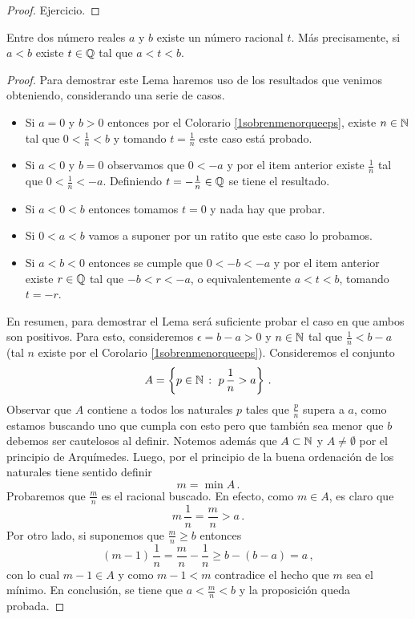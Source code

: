 \begin{proof}
    Ejercicio.
\end{proof}

\begin{lemma}\label{P:densidad de Q en R}
    Entre dos número reales $a$ y $b$ 
    existe un número racional $t$. 
    Más precisamente, si $a < b$ existe 
    $t \in \mathbb{Q}$ tal que $a < t < b$.
\end{lemma}

\begin{proof}
    Para demostrar este Lema haremos uso 
    de los resultados que venimos obteniendo, considerando una serie de 
    casos.
    \begin{itemize}
        \item Si $a = 0$ y $b > 0$ entonces por el Colorario 
        \ref{1sobrenmenorqueeps}, existe ${n\in\mathbb{N}}$ tal que $0<\frac1n < b$ y tomando $t=\frac1n$ este caso está probado.
        \item Si $a < 0$ y $b =0$ observamos que $0 < -a$ y por el 
        item anterior existe $\frac1n$ tal que $0 < \frac1n < -a$. Definiendo $t=-\frac1n \in \mathbb{Q}$ se tiene el resultado.
        \item Si $a < 0 < b$ entonces tomamos $t=0$ y nada hay que probar.
        \item Si $0 < a < b$ vamos a suponer por un ratito que este caso lo probamos.
        \item Si $a < b < 0$ entonces se 
        cumple que $0 < -b < -a$ y por el item anterior existe $r\in \mathbb{Q}$ tal que $-b < r < -a$, o equivalentemente $a < t < b$, tomando $t=-r$.
    \end{itemize}
    En resumen, para demostrar el Lema será suficiente probar el caso en que ambos son positivos. Para esto, consideremos $\epsilon=b-a > 0$ y 
    ${n\in\mathbb{N}}$ tal que $\frac1n < b-a$ (tal $n$ existe por el Corolario \ref{1sobrenmenorqueeps}). 
    Consideremos el conjunto
    \[ A=\left\{p \in \mathbb{N}\,: ~ p\,\frac1n > a\right\}\,. \]
    Observar que $A$ contiene a todos los 
    naturales $p$ tales que $\frac{p}{n}$ supera a $a$, como estamos buscando uno que cumpla con esto pero que también sea menor que $b$ debemos ser cautelosos al definir. 
    Notemos además que $A \subset \mathbb{N}$ y $A \neq \emptyset$ por el principio de Arquímedes. Luego, por el principio de la buena ordenación de los naturales tiene sentido definir 
    \[  m = \min A \,.\]
    Probaremos que $\frac{m}{n}$ es el 
    racional buscado. En efecto, como $m \in A$, es claro que 
    \[ m \, \frac1n = \frac{m}{n} > a\,.\]
%
    Por otro lado, si suponemos que 
    $\frac{m}{n} \geq b$ entonces 
    \[  (m-1)\,\frac1n = \frac{m}{n} - \frac1n \geq b - (b - a) = a\,,\]
    con lo cual $m-1 \in A$ y como $m-1 < m$ contradice el hecho que $m$ sea el mínimo. En conclusión, se tiene que $a < \frac{m}{n} < b$ y la proposición queda probada.
\end{proof}

